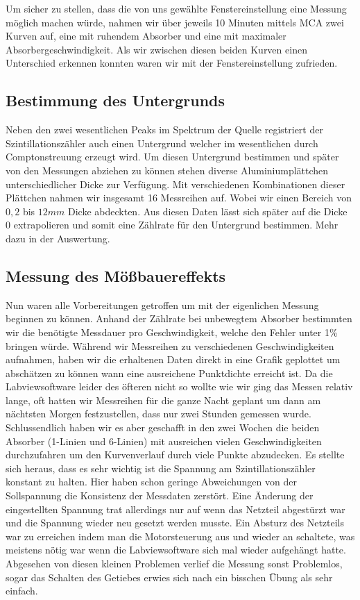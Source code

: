 \documentclass[12pt]{article}
\begin{document}
Um sicher zu stellen, dass die von uns gewählte Fenstereinstellung eine Messung möglich machen würde, nahmen wir über jeweils 10 Minuten mittels MCA zwei Kurven auf, eine mit
ruhendem Absorber und eine mit maximaler Absorbergeschwindigkeit. Als wir zwischen diesen beiden Kurven einen Unterschied erkennen konnten waren wir mit der Fenstereinstellung zufrieden.

\subsection{Bestimmung des Untergrunds}
Neben den zwei wesentlichen Peaks im Spektrum der Quelle registriert der Szintillationszähler auch einen Untergrund welcher im wesentlichen durch Comptonstreuung erzeugt wird. Um diesen
Untergrund bestimmen und später von den Messungen abziehen zu können stehen diverse Aluminiumplättchen unterschiedlicher Dicke zur Verfügung. Mit verschiedenen Kombinationen dieser Plättchen nahmen wir
insgesamt 16 Messreihen auf. Wobei wir einen Bereich von $0,2$ bis $12 mm$ Dicke abdeckten. Aus diesen Daten lässt sich später auf die Dicke 0 extrapolieren und somit eine Zählrate für
den Untergrund bestimmen. Mehr dazu in der Auswertung.

\subsection{Messung des Mößbauereffekts}
Nun waren alle Vorbereitungen getroffen um mit der eigenlichen Messung beginnen zu können. Anhand der Zählrate bei unbewegtem Absorber bestimmten wir die benötigte Messdauer pro Geschwindigkeit,
welche den Fehler unter 1\% bringen würde. Während wir Messreihen zu verschiedenen Geschwindigkeiten aufnahmen, haben wir die erhaltenen Daten direkt in eine Grafik geplottet um abschätzen
zu können wann eine ausreichene Punktdichte erreicht ist. Da die Labviewsoftware leider des öfteren nicht so wollte wie wir ging das Messen relativ lange, oft hatten wir Messreihen für die ganze
Nacht geplant um dann am nächtsten Morgen festzustellen, dass nur zwei Stunden gemessen wurde. Schlussendlich haben wir es aber geschafft in den zwei Wochen die beiden Absorber (1-Linien und 6-Linien)
mit ausreichen vielen Geschwindigkeiten durchzufahren um den Kurvenverlauf durch viele Punkte abzudecken. Es stellte sich heraus, dass es sehr wichtig ist die Spannung am Szintillationszähler konstant
zu halten. Hier haben schon geringe Abweichungen von der Sollspannung die Konsistenz der Messdaten zerstört. Eine Änderung der eingestellten Spannung trat allerdings nur auf wenn das Netzteil
abgestürzt war und die Spannung wieder neu gesetzt werden musste. Ein Absturz des Netzteils war zu erreichen indem man die Motorsteuerung aus und wieder an schaltete, was meistens nötig war
wenn die Labviewsoftware sich mal wieder aufgehängt hatte. Abgesehen von diesen kleinen Problemen verlief die Messung sonst Problemlos, sogar das Schalten des Getiebes erwies sich nach ein bisschen
Übung als sehr einfach.
\end{document}
